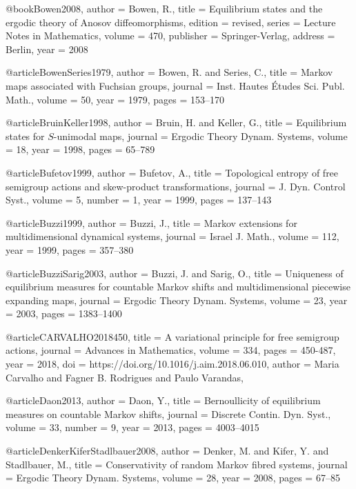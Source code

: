 @book{Bowen2008,
  author = {Bowen, R.},
  title = {Equilibrium states and the ergodic theory of Anosov diffeomorphisms},
  edition = {revised},
  series = {Lecture Notes in Mathematics},
  volume = {470},
  publisher = {Springer-Verlag},
  address = {Berlin},
  year = {2008}
}

@article{BowenSeries1979,
  author = {Bowen, R. and Series, C.},
  title = {Markov maps associated with Fuchsian groups},
  journal = {Inst. Hautes Études Sci. Publ. Math.},
  volume = {50},
  year = {1979},
  pages = {153--170}
}

@article{BruinKeller1998,
  author = {Bruin, H. and Keller, G.},
  title = {Equilibrium states for $S$-unimodal maps},
  journal = {Ergodic Theory Dynam. Systems},
  volume = {18},
  year = {1998},
  pages = {65--789}
}

@article{Bufetov1999,
  author = {Bufetov, A.},
  title = {Topological entropy of free semigroup actions and skew-product transformations},
  journal = {J. Dyn. Control Syst.},
  volume = {5},
  number = {1},
  year = {1999},
  pages = {137--143}
}

@article{Buzzi1999,
  author = {Buzzi, J.},
  title = {Markov extensions for multidimensional dynamical systems},
  journal = {Israel J. Math.},
  volume = {112},
  year = {1999},
  pages = {357--380}
}

@article{BuzziSarig2003,
  author = {Buzzi, J. and Sarig, O.},
  title = {Uniqueness of equilibrium measures for countable Markov shifts and multidimensional piecewise expanding maps},
  journal = {Ergodic Theory Dynam. Systems},
  volume = {23},
  year = {2003},
  pages = {1383--1400}
}

@article{CARVALHO2018450,
title = {A variational principle for free semigroup actions},
journal = {Advances in Mathematics},
volume = {334},
pages = {450-487},
year = {2018},
doi = {https://doi.org/10.1016/j.aim.2018.06.010},
author = {Maria Carvalho and Fagner B. Rodrigues and Paulo Varandas},
}



@article{Daon2013,
  author = {Daon, Y.},
  title = {Bernoullicity of equilibrium measures on countable Markov shifts},
  journal = {Discrete Contin. Dyn. Syst.},
  volume = {33},
  number = {9},
  year = {2013},
  pages = {4003--4015}
}

@article{DenkerKiferStadlbauer2008,
  author = {Denker, M. and Kifer, Y. and Stadlbauer, M.},
  title = {Conservativity of random Markov fibred systems},
  journal = {Ergodic Theory Dynam. Systems},
  volume = {28},
  year = {2008},
  pages = {67--85}
}

